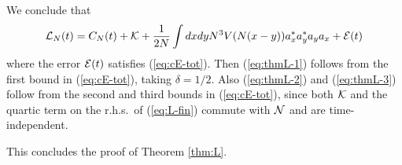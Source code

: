 \documentclass[11pt,a4paper]{article}
\newcommand{\cE}{{\cal E}}
\newcommand{\cK}{{\cal K}}
\newcommand{\cH}{{\cal H}}
\newcommand{\cL}{{\cal L}}
\newcommand{\cN}{{\cal N}}
\begin{document}
We conclude that
\begin{equation}\label{eq:L-fin} \cL_N (t) = C_N (t) + \cK  + \frac{1}{2N}  \int dx dy N^3 V (N (x-y)) a_x^* a_y^* a_y a_x + \cE (t) \end{equation}
where the error $\cE (t)$ satisfies (\ref{eq:cE-tot}). Then (\ref{eq:thmL-1}) follows from the first bound in (\ref{eq:cE-tot}), taking $\delta = 1/2$. Also (\ref{eq:thmL-2}) and (\ref{eq:thmL-3}) follow from the second and third bounds in (\ref{eq:cE-tot}), since both $\cK$ and the quartic term on the r.h.s.\ of (\ref{eq:L-fin}) commute with $\cN$ and are time-independent. 

This concludes the proof of Theorem \ref{thm:L}.


\end{document}
